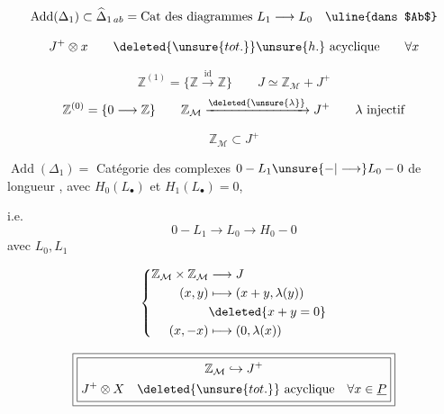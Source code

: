 
\[
\operatorname{Add}(\Delta_1)\subset\widehat\Delta_{1\,ab}
=\text{Cat des diagrammes }L_1\longrightarrow L_0\quad\text{\uline{dans $Ab$}}
\]

\[
J^+\otimes x\qquad\deleted{\unsure{tot.}}\unsure{h.}\ \text{acyclique}
\qquad\forall x
\]

\[
\mathbb Z^{(1)}=\{\mathbb Z\xrightarrow{\mathrm{id}}\mathbb Z\}
\qquad
J\simeq\mathbb Z_{\mathcal M}+J^+
\]
\[
\mathbb Z^{(0)}=\{0\longrightarrow\mathbb Z\}
\qquad
\mathbb Z_{\mathcal M}\xrightarrow{\deleted{\unsure{\lambda}}}J^+
\qquad\lambda\ \text{injectif}
\]

\[
\mathbb Z_{\mathcal M}\subset J^+
\]

\noindent
$\operatorname{Add}(\Delta_1)=$ Catégorie des complexes
$0\mathbin{-}L_1\unsure{\mathbin{-}|\longrightarrow}L_0\mathbin{-}0$
de longueur , avec
$H_0(L_\bullet)$ 
et $H_1(L_\bullet)=0$,

\noindent i.e.
\[
0\mathbin{-}L_1\longrightarrow L_0\longrightarrow H_0\mathbin{-}0
\]
avec $L_0,L_1$

\[
\left\{\begin{aligned}
\mathbb Z_{\mathcal M}\times\mathbb Z_{\mathcal M}&\longrightarrow J\\
(x,y)&\longmapsto(x+y,\lambda(y))\\
&\deleted{x+y=0}\\
(x,-x)&\longmapsto(0,\lambda(x))
\end{aligned}\right.
\]

\[
\boxed{\boxed{\begin{gathered}
\mathbb Z_{\mathcal M}\hookrightarrow J^+\\
J^+\otimes X\quad\deleted{\unsure{tot.}}\ \text{acyclique}\quad
\forall x\in\underline P
\end{gathered}}}
\]


